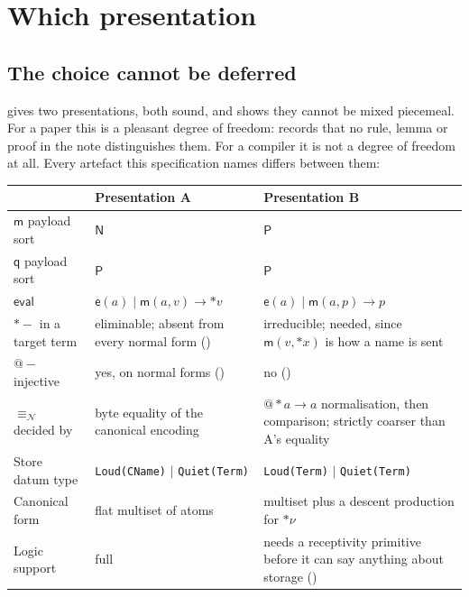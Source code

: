 \documentclass[11pt,a4paper]{article}
\makeatletter
\newcommand{\code}[1]{\texttt{#1}}
\newcommand{\quo}[1]{@#1}
\newcommand{\drp}[1]{{*}#1}
\newcommand{\nequiv}{\equiv_{\mathcal{N}}}
\newcommand{\Nsort}{\mathsf{N}}
\newcommand{\Psort}{\mathsf{P}}
\newcommand{\mm}{\mathsf{m}}
\newcommand{\ev}{\mathsf{e}}
\newcommand{\qq}{\mathsf{q}}
\newcommand{\red}{\longrightarrow}
\theoremstyle{definition}
\theoremstyle{plain}
\makeatother
\begin{document}
\section{Which presentation}\label{sec:which}

\subsection{The choice cannot be deferred}

\cite[\S3.3]{draft3} gives two presentations, both sound, and
\cite[Rem.~3.2]{draft3} shows they cannot be mixed piecemeal. For a paper this
is a pleasant degree of freedom: \cite[Def.~3.3]{draft3} records that no rule,
lemma or proof in the note distinguishes them. For a compiler it is not a
degree of freedom at all. Every artefact this specification names differs
between them:

\begin{center}
\begin{tabularx}{\linewidth}{@{}l>{\raggedright\arraybackslash}X>{\raggedright\arraybackslash}X@{}}
\toprule
& Presentation A & Presentation B\\
\midrule
$\mm$ payload sort & $\Nsort$ & $\Psort$\\
$\qq$ payload sort & $\Psort$ & $\Psort$\\
$\mathsf{eval}$ & $\ev(a) \mid \mm(a,v) \red \drp{v}$ &
  $\ev(a) \mid \mm(a,p) \red p$\\
$\drp{-}$ in a target term & eliminable; absent from every normal form
  (\cite[Lem.~2.8]{logic}) & irreducible; needed, since $\mm(v,\drp{x})$ is how
  a name is sent\\
$\quo{-}$ injective & yes, on normal forms (\cite[Prop.~2.10]{logic}) &
  no (\cite[Prop.~2.4(ii)]{logic})\\
$\nequiv$ decided by & byte equality of the canonical encoding &
  $\quo{\drp{a}} \to a$ normalisation, then comparison; strictly coarser than
  A's equality\\
Store datum type & \code{Loud(CName)} $\mid$ \code{Quiet(Term)} &
  \code{Loud(Term)} $\mid$ \code{Quiet(Term)}\\
Canonical form & flat multiset of atoms & multiset plus a descent production
  for $\drp{\nu}$\\
Logic support & full & needs a receptivity primitive before it can say
  anything about storage (\cite[Rem.~2.5]{logic})\\
\bottomrule
\end{tabularx}
\end{center}
\end{document}
